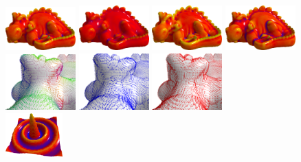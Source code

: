 \documentclass{llncs}
\begin{document}
\begin{figure}
  \begin{center}
    {\includegraphics[width=2.7cm]{figs/EG_dragon_mean}}
    {\includegraphics[width=2.7cm]{figs/EG_dragon_gaussian}}
    {\includegraphics[width=2.7cm]{figs/EG_dragon_k1}}
    {\includegraphics[width=2.7cm]{figs/EG_dragon_k2}}\\
    {\includegraphics[width=2.7cm]{figs/EG_dragon_normal_zoom}}
    {\includegraphics[width=2.7cm]{figs/EG_dragon_dir_min_zoom}}
    {\includegraphics[width=2.7cm]{figs/EG_dragon_dir_max_zoom}}\\
    {\includegraphics[width=2.2cm]{figs/function_mean_0}}

\end{center}
\end{figure}
\end{document}
